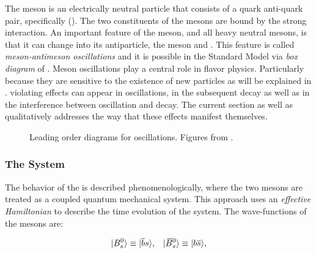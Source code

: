 The \Bs meson is an electrically neutral particle that consists of a quark anti-quark pair, specifically (\bquarkbar\squark).
The two constituents of the mesons are bound by the strong interaction. An important feature of
the \Bs meson, and all heavy neutral mesons, is that it can change into its antiparticle,
the \Bsb meson and \viceversa. This feature is called {\it meson-antimeson oscillations} and it is possible
in the Standard Model via  {\it box diagram} of .
Meson oscillations play a central role in flavor physics. Particularly because they are sensitive to the
existence of new particles as will be explained in . \CP violating effects can
appear in \BBbarSyst oscillations, in the subsequent decay as well as in the interference between oscillation
and decay. The current section as well as  qualitatively addresses the way that
these effects manifest themselves.

\begin{figure}[!h]
  \centering
  \begin{subfigure}{0.5\textwidth}
    \centering
    \raggedright
    \scalebox{0.9}{\sffamily }
    \caption{}
    \label{bs_box_1}
  \end{subfigure}%
  \hfill%
  \begin{subfigure}{0.5\textwidth}
    \centering
    \raggedleft
    \scalebox{0.9}{\sffamily }
    \caption{}
    \label{bs_box_2}
  \end{subfigure}
  \caption{Leading order diagrams for \BBbarSyst oscillations. Figures from \cite{jeroenThesis}.}
  \label{bs_box}
\end{figure}

\subsubsection{The \BBbarSyst System}
\label{the_bbar_system}

The behavior of the \BBbarSyst is described phenomenologically, where the two mesons are treated as a
coupled quantum mechanical system. This approach \cite{Weisskopf:1930au,Weisskopf:1930ps} uses an {\it effective Hamiltonian}
\cite{eff-hamiltonian-bs-syst,DeBruyn-thesis} to describe the time evolution of the system.
The wave-functions of the mesons are:

\begin{equation}
  \centering
  \ket{\Bs}  \equiv  \ket{\bquarkbar\squark}, \;\;\; \ket{\Bsb} \equiv  \ket{\bquark\squarkbar},
  \label{bs_wavefunctions}
\end{equation}

